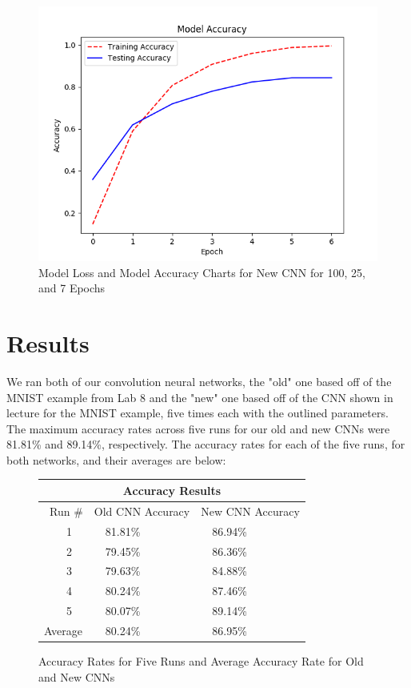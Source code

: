 \documentclass[11pt]{article}
\begin{document}
\begin{figure}[H]
\begin{center}
    \includegraphics[scale = 0.5]{images/NewModelAccuracy7Epochs.png}
    \caption{Model Loss and Model Accuracy Charts for New CNN for 100, 25, and 7 Epochs}
\end{center}
\end{figure}

\section{Results}

We ran both of our convolution neural networks, the "old" one based off of the MNIST example from Lab 8 and the "new" one based off of the CNN shown in lecture for the MNIST example, five times each with the outlined parameters. The maximum accuracy rates across five runs for our old and new CNNs were 81.81\% and 89.14\%, respectively. The accuracy rates for each of the five runs, for both networks, and their averages are below:

\begin{figure}[H]
\begin{center}
\begin{tabular}{ |p{1.4cm}||p{1.8cm}|p{1.8cm}| }
 \hline
 \multicolumn{3}{|c|}{Accuracy Results} \\
 \hline
 \ Run \# & Old CNN Accuracy & New CNN Accuracy\\
 \hline
 \ \ \ \ 1 & \ \ 81.81\%    & \ \ 86.94\%\\
 \ \ \ \ 2 &  \ \ 79.45\% & \ \ 86.36\%  \\
 \ \ \ \ 3 & \ \ 79.63\% & \ \ 84.88\%\\
 \ \ \ \ 4 & \ \ 80.24\% & \ \ 87.46\%\\
 \ \ \ \ 5 & \ \ 80.07\% & \ \ 89.14\%\\
 \hline
 Average& \ \ 80.24\% & \ \ 86.95\%\\
 \hline
\end{tabular}
\caption{Accuracy Rates for Five Runs and Average Accuracy Rate for Old and New CNNs}
\end{center}
\end{figure}
\end{document}
